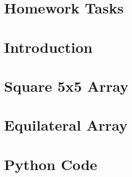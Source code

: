 \documentclass[10pt, a4paper]{article}
\begin{document}


\section*{Homework Tasks}

\pagebreak

\section{Introduction}


\section{Square 5x5 Array}


\section{Equilateral Array}


\pagebreak

\printbibheading
\begin{refsection}
\nocite{*}
\printbibliography[heading=subbibliography,title={Literature}]
\end{refsection}

\begin{refsection}
\nocite{*}
\printbibliography[heading=subbibliography,title={Software Used}]
\end{refsection}

\begin{refsection}
\nocite{*}
\printbibliography[heading=subbibliography,title={Web}]
\end{refsection}

\pagebreak
\appendix
\section{Python Code}\label{app:script}
\inputminted{python}{./code/square-array.py}
\end{document}

